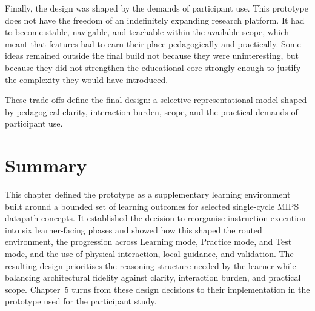 Finally, the design was shaped by the demands of participant use. This prototype does not have the freedom of an indefinitely expanding research platform. It had to become stable, navigable, and teachable within the available scope, which meant that features had to earn their place pedagogically and practically. Some ideas remained outside the final build not because they were uninteresting, but because they did not strengthen the educational core strongly enough to justify the complexity they would have introduced.

These trade-offs define the final design: a selective representational model shaped by pedagogical clarity, interaction burden, scope, and the practical demands of participant use.

\section{Summary}

This chapter defined the prototype as a supplementary learning environment built around a bounded set of learning outcomes for selected single-cycle MIPS datapath concepts. It established the decision to reorganise instruction execution into six learner-facing phases and showed how this shaped the routed environment, the progression across Learning mode, Practice mode, and Test mode, and the use of physical interaction, local guidance, and validation. The resulting design prioritises the reasoning structure needed by the learner while balancing architectural fidelity against clarity, interaction burden, and practical scope. Chapter~5 turns from these design decisions to their implementation in the prototype used for the participant study.
